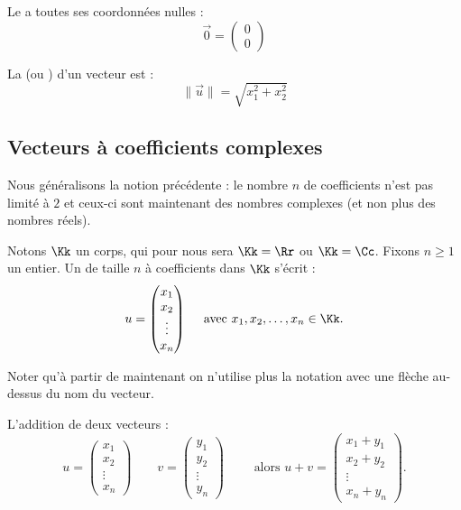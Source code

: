 \documentclass[11pt,class=report,crop=false]{standalone}
\begin{document}

Le  a toutes ses coordonnées nulles :
$$\vec 0 = \begin{pmatrix}0 \\ 0\end{pmatrix}$$

La  (ou ) d'un vecteur est :
$$\| \vec u \| = \sqrt{x_1^2+x_2^2}$$



\subsection{Vecteurs à coefficients complexes}

Nous généralisons la notion précédente : le nombre $n$ de coefficients n'est pas limité à $2$ et ceux-ci sont maintenant des nombres complexes (et non plus des nombres réels). 

Notons $\Kk$ un corps, qui pour nous sera $\Kk=\Rr$ ou $\Kk=\Cc$.
Fixons $n\ge1$ un entier. 
Un  de taille $n$ à coefficients dans $\Kk$ s'écrit :
$$u = \begin{pmatrix}x_1\\x_2\\\vdots\\x_n\end{pmatrix} \quad \text{ avec } x_1,x_2,\ldots,x_n \in \Kk.$$

Noter qu'à partir de maintenant on n'utilise plus la notation avec une flèche au-dessus du nom du vecteur.

L'addition de deux vecteurs :
$$u = \begin{pmatrix}x_1\\x_2\\\vdots\\x_n\end{pmatrix} \qquad 
v = \begin{pmatrix}y_1\\y_2\\\vdots\\y_n\end{pmatrix}
 \qquad \text{ alors } u+v =\begin{pmatrix}x_1+y_1\\x_2+y_2\\\vdots\\x_n+y_n\end{pmatrix}.$$
\end{document}
